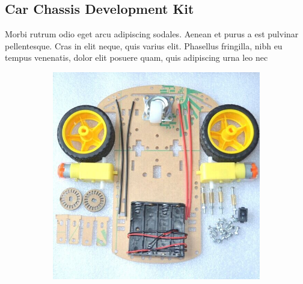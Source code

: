 \subsection{Car Chassis Development Kit}

Morbi rutrum odio eget arcu adipiscing sodales. Aenean et purus a est pulvinar pellentesque. Cras in elit neque, quis varius elit. Phasellus fringilla, nibh eu tempus venenatis, dolor elit posuere quam, quis adipiscing urna leo nec 

\begin{figure}[h!]
        \centering
        \begin{subfigure}[b]{0.5\textwidth}
                \includegraphics[width=\textwidth]{./Pictures/Car-Chassis-Kit.jpg}
        \end{subfigure}%
        ~ %
        \begin{subfigure}[b]{0.5\textwidth}

\end{subfigure}
\end{figure}
